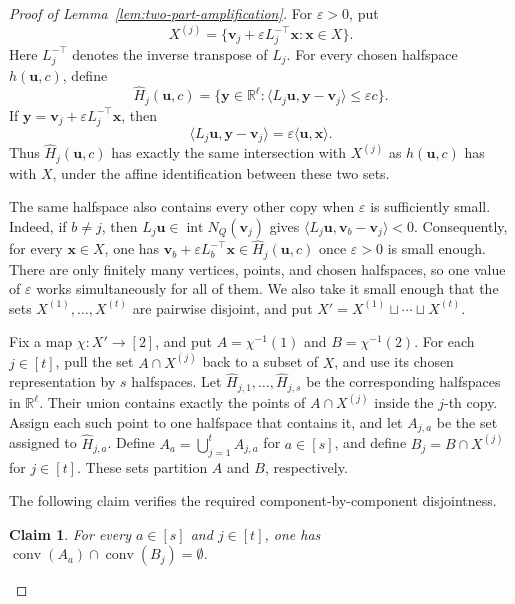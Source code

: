 \documentclass[11pt]{article}
\newtheorem{claim}[theorem]{Claim}
\theoremstyle{definition}
\newcommand{\R}{\mathbb{R}}
\begin{document}
\begin{proof}[Proof of Lemma~\ref{lem:two-part-amplification}]
For \(\varepsilon>0\), put
\[
X^{(j)}=\{\boldsymbol{v}_{j}+\varepsilon L_{j}^{-\top}\boldsymbol{x}:\boldsymbol{x}\in X\}.
\]
Here \(L_{j}^{-\top}\) denotes the inverse transpose of \(L_{j}\).
For every chosen halfspace \(h(\boldsymbol{u},c)\), define
\[
\widehat H_{j}(\boldsymbol{u},c)=\{\boldsymbol{y}\in\R^{\ell}:\langle L_{j}\boldsymbol{u},\boldsymbol{y}-\boldsymbol{v}_{j}\rangle\le\varepsilon c\}.
\]
If \(\boldsymbol{y}=\boldsymbol{v}_{j}+\varepsilon L_{j}^{-\top}\boldsymbol{x}\), then
\[
\langle L_{j}\boldsymbol{u},\boldsymbol{y}-\boldsymbol{v}_{j}\rangle=\varepsilon\langle\boldsymbol{u},\boldsymbol{x}\rangle.
\]
Thus \(\widehat H_{j}(\boldsymbol{u},c)\) has exactly the same intersection with \(X^{(j)}\) as \(h(\boldsymbol{u},c)\) has with \(X\), under the affine identification between these two sets.

The same halfspace also contains every other copy when \(\varepsilon\) is sufficiently small. Indeed, if \(b\ne j\), then \(L_{j}\boldsymbol{u}\in\operatorname{int}N_{Q}(\boldsymbol{v}_{j})\) gives
\(
\langle L_{j}\boldsymbol{u},\boldsymbol{v}_{b}-\boldsymbol{v}_{j}\rangle<0.
\)
Consequently, for every \(\boldsymbol{x}\in X\), one has \(\boldsymbol{v}_{b}+\varepsilon L_{b}^{-\top}\boldsymbol{x}\in\widehat H_{j}(\boldsymbol{u},c)\) once \(\varepsilon>0\) is small enough. There are only finitely many vertices, points, and chosen halfspaces, so one value of \(\varepsilon\) works simultaneously for all of them. We also take it small enough that the sets \(X^{(1)},\ldots,X^{(t)}\) are pairwise disjoint, and put \(X'=X^{(1)}\sqcup\cdots\sqcup X^{(t)}\).

Fix a map \(\chi:X'\to[2]\), and put \(A=\chi^{-1}(1)\) and \(B=\chi^{-1}(2)\). For each \(j\in[t]\), pull the set \(A\cap X^{(j)}\) back to a subset of \(X\), and use its chosen representation by \(s\) halfspaces. Let \(\widehat H_{j,1},\ldots,\widehat H_{j,s}\) be the corresponding halfspaces in \(\R^{\ell}\). Their union contains exactly the points of \(A\cap X^{(j)}\) inside the \(j\)-th copy. Assign each such point to one halfspace that contains it, and let \(A_{j,a}\) be the set assigned to \(\widehat H_{j,a}\). Define \(A_{a}=\bigcup_{j=1}^{t}A_{j,a}\) for \(a\in[s]\), and define \(B_{j}=B\cap X^{(j)}\) for \(j\in[t]\). These sets partition \(A\) and \(B\), respectively.

The following claim verifies the required component-by-component disjointness.

\begin{claim}\label{claim:two-part-disjoint}
For every \(a\in[s]\) and \(j\in[t]\), one has \(\operatorname{conv}(A_{a})\cap\operatorname{conv}(B_{j})=\emptyset\).
\end{claim}


\end{proof}
\end{document}
